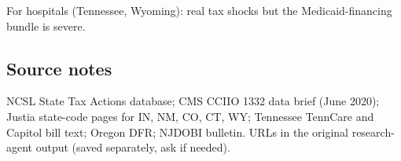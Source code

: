 For hospitals (Tennessee, Wyoming): real tax shocks but the
Medicaid-financing bundle is severe.

\subsection*{Source notes}

NCSL State Tax Actions database; CMS CCIIO 1332 data brief
(June 2020); Justia state-code pages for IN, NM, CO, CT,
WY; Tennessee TennCare and Capitol bill text; Oregon DFR;
NJDOBI bulletin. URLs in the original research-agent
output (saved separately, ask if needed).
